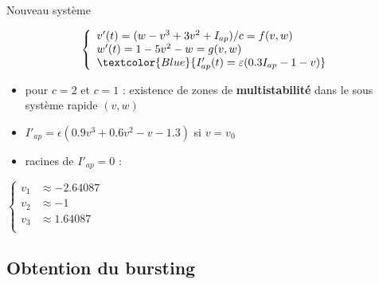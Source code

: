 \documentclass[xcolor={dvipsnames},10pt]{beamer}
\begin{document}
\begin{frame}
\tableofcontents[currentsection]
\end{frame}

\begin{frame}{Nouveau système}

\begin{equation}
\left\{
\begin{array}{l }
v'(t)= (w - v^3 + 3v^2 +I_{ap})/c = f(v,w) \\
w'(t) = 1 - 5 v^2 - w = g(v,w)  \\
\textcolor{Blue}{I_{ap}'(t)= \varepsilon (0.3 I_{ap} -1 -v)}
\end{array}
\right.
\end{equation}

\begin{itemize}
\item pour $c=2$ et $c=1$ : existence de zones de \textbf{multistabilité} dans le sous système rapide $(v,w)$
\item $I'_{ap} = \epsilon(0.9v^3+0.6v^2-v-1.3)$ si $v = v_0$
\item racines de $I'_{ap} = 0$ :
\end{itemize}
\begin{center}
$\left\{
\begin{array}{rl}
v_1 &\approx -2.64087\\
v_2 &\approx -1\\
v_3 &\approx 1.64087\\
\end{array}
\right.$

\end{center}
\end{frame}

\subsection{Obtention du bursting}
\end{document}
